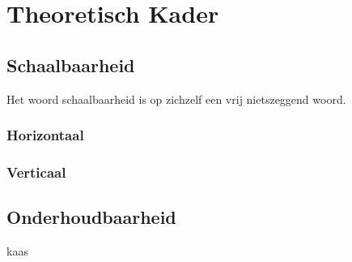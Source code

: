 \chapter{Theoretisch Kader}
\label{Chapter2}

\section{Schaalbaarheid}

Het woord schaalbaarheid is op zichzelf een vrij nietszeggend woord.

\subsection{Horizontaal}

\subsection{Verticaal}

\section{Onderhoudbaarheid}
kaas